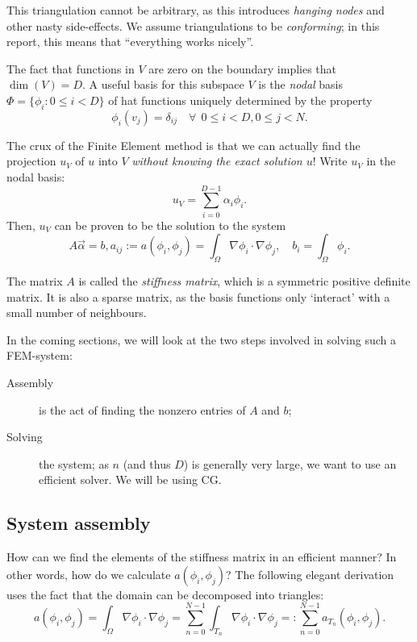 \documentclass[11pt]{amsart}
\theoremstyle{definition}
\begin{document}
This triangulation cannot be arbitrary, as this introduces \emph{hanging nodes} and other nasty side-effects. We assume triangulations to be \emph{conforming}; in this report, this means that ``everything works nicely''.

The fact that functions in $V$ are zero on the boundary implies that $\dim(V) = D$. A useful basis for this subspace $V$ is the \emph{nodal} basis $\Phi = \{\phi_i: 0 \leq i < D\}$ of hat functions uniquely determined by the property
\[
  \phi_i( v_j) = \delta_{ij} \quad \forall~~0 \leq i < D, 0 \leq j < N.
\]

The crux of the Finite Element method is that we can actually find the projection $u_V$ of $u$ into $V$ \emph{without knowing the exact solution $u$}! Write $u_V$ in the nodal basis:
\[
  u_V = \sum_{i=0}^{D-1} \alpha_i \phi_i.
\]
Then, $u_V$ can be proven \cite{TODO} to be the solution to the system
\[
  A\vec \alpha = b, a_{ij} := a(\phi_i, \phi_j) = \int_\Omega \nabla \phi_i \cdot \nabla \phi_j, \quad b_i = \int_\Omega \phi_i.
\]

The matrix $A$ is called the \emph{stiffness matrix}, which is \cite{TODORAYMOND} a symmetric positive definite matrix. It is also a sparse matrix, as the basis functions only `interact' with a small number of neighbours.

In the coming sections, we will look at the two steps involved in solving such a FEM-system:
\begin{description}
  \item[Assembly] is the act of finding the nonzero entries of $A$ and $b$;
  \item[Solving] the system; as $n$ (and thus $D$) is generally very large, we want to use an efficient solver. We will be using CG.
\end{description}

\subsection{System assembly}
How can we find the elements of the stiffness matrix in an efficient manner? In other words, how do we calculate $a(\phi_i, \phi_j)$? The following elegant derivation uses the fact that the domain can be decomposed into triangles:
\begin{equation}
  \label{eqn:div}
  a(\phi_i, \phi_j) = \int_\Omega \nabla \phi_i \cdot \nabla \phi_j = \sum_{n = 0}^{N-1} \int_{T_n} \nabla \phi_i \cdot \nabla \phi_j =: \sum_{n=0}^{N-1}a_{T_n}(\phi_i, \phi_j).
\end{equation}
\end{document}
